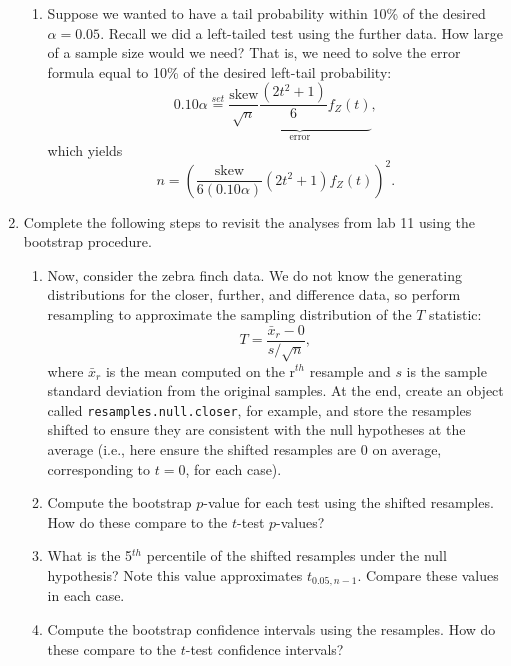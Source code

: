 \documentclass{article}\usepackage[]{graphicx}\usepackage[]{xcolor}
\begin{document}
\begin{enumerate}
\begin{enumerate}
  \item Suppose we wanted to have a tail probability within 10\% of the desired
  $\alpha=0.05$. Recall we did a left-tailed test using the further data.
  How large of a sample size would we need? That is, we need
  to solve the error formula equal to 10\% of the desired left-tail probability:
  \[0.10 \alpha  \stackrel{set}{=} \underbrace{\frac{\text{skew}}{\sqrt{n}} \frac{(2t^2+1)}{6} f_Z(t)}_{\textrm{error}},\]
  which yields
  \[ n = \left(\frac{\text{skew}}{6(0.10\alpha)} (2t^2 + 1) f_Z(t)\right)^2.\]
\end{enumerate}
\item Complete the following steps to revisit the analyses from lab 11 using the
bootstrap procedure.
\begin{enumerate}
\item Now, consider the zebra finch data. We do not know the generating distributions
for the closer, further, and difference data, so perform resampling to approximate the 
sampling distribution of the $T$ statistic:
  \[T = \frac{\bar{x}_r - 0}{s/\sqrt{n}},\]
  where $\bar{x}_r$ is the mean computed on the r$^{th}$ resample and $s$ is the
  sample standard deviation from the original samples. At the end, create an
  object called \texttt{resamples.null.closer}, for example, and store the 
  resamples shifted to ensure they are consistent with the null hypotheses at the average 
  (i.e., here ensure the shifted resamples are 0 on average, corresponding
  to $t=0$, for each case). 
  \item Compute the bootstrap $p$-value for each test using the shifted resamples. 
  How do these compare to the $t$-test $p$-values?
    \item What is the 5$^{th}$ percentile of the shifted resamples under the null hypothesis? 
  Note this value approximates $t_{0.05, n-1}$. Compare these values in each case.
  \item Compute the bootstrap confidence intervals using the resamples. How do these 
  compare to the $t$-test confidence intervals?
\end{enumerate}

\end{enumerate}
\end{document}
